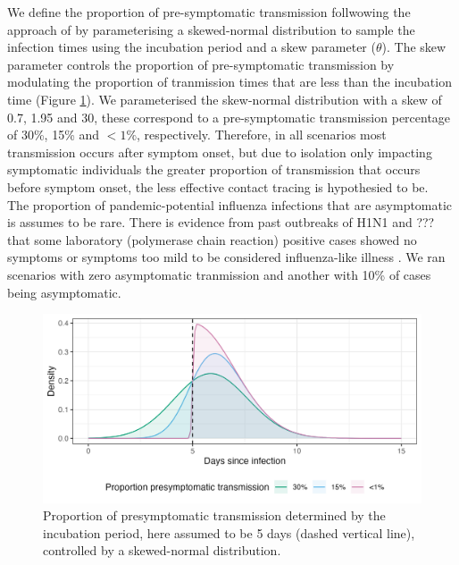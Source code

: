 \documentclass{article}
\begin{document}
\clearpage

We define the proportion of pre-symptomatic transmission follwowing the approach of \cite{hellewellFeasibilityControllingCOVID192020} by parameterising a skewed-normal distribution to sample the infection times using the incubation period and a skew parameter ($\theta$). The skew parameter controls the proportion of pre-symptomatic transmission by modulating the proportion of tranmission times that are less than the incubation time (Figure \ref{fig:prop-presym-trans}). We parameterised the skew-normal distribution with a skew of 0.7, 1.95 and 30, these correspond to a pre-symptomatic transmission percentage of 30\%, 15\% and $<1\%$, respectively. Therefore, in all scenarios most transmission occurs after symptom onset, but due to isolation only impacting symptomatic individuals the greater proportion of transmission that occurs before symptom onset, the less effective contact tracing is hypothesied to be. \\

The proportion of pandemic-potential influenza infections that are asymptomatic is assumes to be rare. There is evidence from past outbreaks of H1N1 and ??? that some laboratory (polymerase chain reaction) positive cases showed no symptoms or symptoms too mild to be considered influenza-like illness \citep{lesslerOutbreak2009Pandemic2009}. We ran scenarios with zero asymptomatic tranmission and another with 10\% of cases being asymptomatic. \\

\begin{figure}[ht]
\centering
\includegraphics[width=\textwidth]{../plots/prop_presymptomatic_transmission.png}
\caption{Proportion of presymptomatic transmission determined by the incubation period, here assumed to be 5 days (dashed vertical line), controlled by a skewed-normal distribution.}
\label{fig:prop-presym-trans}
\end{figure}
\end{document}
